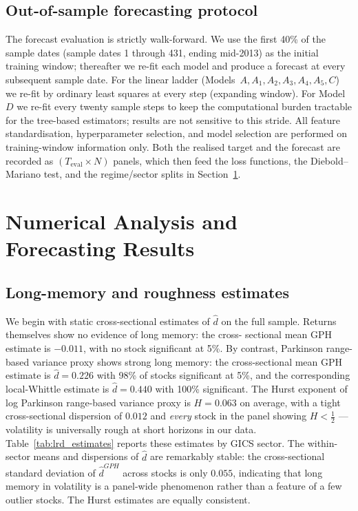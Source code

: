 \documentclass[11pt,a4paper]{article}
\newcommand{\dhat}{\hat d}
\begin{document}


\subsection{Out-of-sample forecasting protocol}

The forecast evaluation is strictly walk-forward. We use the first 40\%
of the sample dates (sample dates 1 through 431, ending mid-2013) as the
initial training window; thereafter we re-fit each model and produce a
forecast at every subsequent sample date. For the linear ladder
(Models~$A,A_1,A_2,A_3,A_4,A_5,C$) we re-fit by ordinary least squares
at every step (expanding window). For Model~$D$ we
re-fit every twenty sample steps to keep the computational burden
tractable for the tree-based estimators; results are not sensitive to
this stride. All feature standardisation, hyperparameter selection, and
model selection are performed on training-window information only.
Both the realised target and the forecast are recorded as
$(T_{\mathrm{eval}}\!\times\!N)$ panels, which then feed the loss
functions, the Diebold--Mariano test, and the regime/sector splits in
Section~\ref{sec:results}.

\section{Numerical Analysis and Forecasting Results}
\label{sec:results}

\subsection{Long-memory and roughness estimates}

We begin with static cross-sectional estimates of $\dhat$ on the full
sample. Returns themselves show no evidence of long memory: the cross-
sectional mean GPH estimate is $-0.011$, with no stock significant at
5\%. By contrast, Parkinson range-based variance proxy shows strong long memory:
the cross-sectional mean GPH estimate is $\dhat = 0.226$ with 98\% of
stocks significant at 5\%, and the corresponding local-Whittle estimate
is $\dhat = 0.440$ with 100\% significant. The Hurst exponent of log
Parkinson range-based variance proxy is $H = 0.063$ on average, with a tight
cross-sectional dispersion of $0.012$ and \emph{every} stock in the
panel showing $H<\tfrac12$ --- volatility is universally rough at short
horizons in our data. Table~\ref{tab:lrd_estimates} reports these
estimates by GICS sector. The within-sector means and dispersions of
$\dhat$ are remarkably stable: the cross-sectional standard deviation of
$\dhat^{GPH}$ across stocks is only $0.055$, indicating that long memory
in volatility is a panel-wide phenomenon rather than a feature of a few
outlier stocks. The Hurst estimates are equally consistent.
\end{document}
